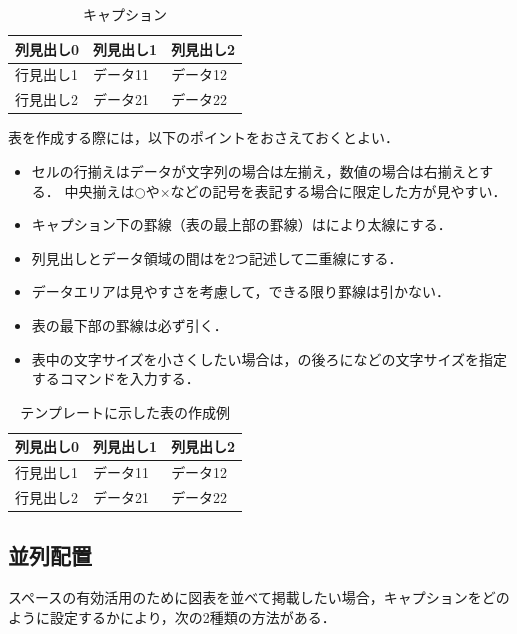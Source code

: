 \documentclass[a4j,11pt]{ujreport}
\begin{document}
\begin{code}
\begin{table}[位置]
	\centering 
	\caption{キャプション}
	\label{tab:ラベル}
	\small	%
	\begin{tabular}{l|ll}
		\Hline 
		列見出し0 & 列見出し1 & 列見出し2\\ 
		\hline\hline
		行見出し1 & データ11 & データ12\\
		行見出し2 & データ21 & データ22\\
		\hline 
	\end{tabular} 
\end{table}
\end{code}%

表を作成する際には，以下のポイントをおさえておくとよい．
\begin{itemize}
\item セルの行揃えはデータが文字列の場合は左揃え，数値の場合は右揃えとする．
中央揃えは$\bigcirc$や$\times$などの記号を表記する場合に限定した方が見やすい．
\item キャプション下の罫線（表の最上部の罫線）はにより太線にする．
\item 列見出しとデータ領域の間はを2つ記述して二重線にする．
\item データエリアは見やすさを考慮して，できる限り罫線は引かない．
\item 表の最下部の罫線は必ず引く．
\item 表中の文字サイズを小さくしたい場合は，の後ろになどの文字サイズを指定するコマンドを入力する．
\end{itemize}

\begin{table}[ht]
	\centering
	\caption{テンプレートに示した表の作成例}
	\label{tab:ExampleTable}
	\small
	\begin{tabular}{l|ll}
		\Hline 
		列見出し0 & 列見出し1 & 列見出し2\\ 
		\hline\hline
		行見出し1 & データ11 & データ12\\
		行見出し2 & データ21 & データ22\\
		\hline 
	\end{tabular} 
\end{table}

\subsection{並列配置}
スペースの有効活用のために図表を並べて掲載したい場合，キャプションをどのように設定するかにより，次の2種類の方法がある．
\end{document}
